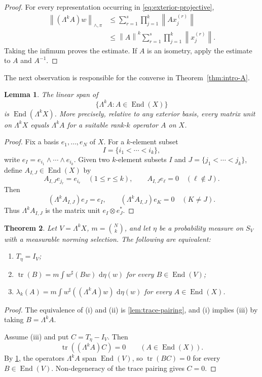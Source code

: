 \documentclass[11pt,a4paper]{amsart}
\numberwithin{equation}{section}
\theoremstyle{plain}
\newtheorem{theorem}{Theorem}[section]
\newtheorem{lemma}[theorem]{Lemma}
\theoremstyle{definition}
\theoremstyle{remark}
\DeclareMathOperator{\End}{End}
\DeclareMathOperator{\tr}{tr}
\newcommand{\dd}{\,\mathrm{d}}
\newcommand{\Id}{I}
\newcommand{\norm}[1]{\left\|#1\right\|}
\begin{document}
\begin{proof}
For every representation occurring in \eqref{eq:exterior-projective},
\begin{align*}
\norm{(\Lambda^kA)w}_{\wedge,\pi}
&\leqslant\sum_{r=1}^s\prod_{j=1}^k\norm{Ax_j^{(r)}}\\
&\leqslant\norm{A}^k\sum_{r=1}^s\prod_{j=1}^k\norm{x_j^{(r)}}.
\end{align*}
Taking the infimum proves the estimate. If $A$ is an isometry, apply the estimate to $A$ and $A^{-1}$.
\end{proof}

The next observation is responsible for the converse in Theorem~\ref{thm:intro-A}.

\begin{lemma}\label{lem:matrix-units}
The linear span of
\[
\{\Lambda^kA:A\in\End(X)\}
\]
is $\End(\Lambda^kX)$. More precisely, relative to any exterior basis, every matrix unit on $\Lambda^kX$ equals $\Lambda^kA$ for a suitable rank-$k$ operator $A$ on $X$.
\end{lemma}

\begin{proof}
Fix a basis $e_1,\ldots,e_N$ of $X$. For a $k$-element subset
\[
I=\{i_1<\cdots<i_k\},
\]
write $e_I=e_{i_1}\wedge\cdots\wedge e_{i_k}$. Given two $k$-element subsets $I$ and $J=\{j_1<\cdots<j_k\}$, define $A_{I,J}\in\End(X)$ by
\[
A_{I,J}e_{j_r}=e_{i_r}\quad(1\leqslant r\leqslant k),
\qquad
A_{I,J}e_\ell=0\quad(\ell\notin J).
\]
Then
\[
(\Lambda^kA_{I,J})e_J=e_I,
\qquad
(\Lambda^kA_{I,J})e_K=0\quad(K\neq J).
\]
Thus $\Lambda^kA_{I,J}$ is the matrix unit $e_I\otimes e_J^*$.
\end{proof}

\begin{theorem}\label{thm:exact-criterion}
Let $V=\Lambda^kX$, $m=\binom Nk$, and let $\eta$ be a probability measure on $S_V$ with a measurable norming selection. The following are equivalent:
\begin{enumerate}[label=\textup{(\roman*)}]
\item $T_\eta=\Id_V$;
\item $\tr(B)=m\int w^\sharp(Bw)\,\dd\eta(w)$ for every $B\in\End(V)$;
\item $\lambda_k(A)=m\int w^\sharp((\Lambda^kA)w)\,\dd\eta(w)$ for every $A\in\End(X)$.
\end{enumerate}
\end{theorem}

\begin{proof}
The equivalence of (i) and (ii) is \cref{lem:trace-pairing}, and (i) implies (iii) by taking $B=\Lambda^kA$.

Assume (iii) and put $C=T_\eta-\Id_V$. Then
\[
\tr((\Lambda^kA)C)=0
\qquad(A\in\End(X)).
\]
By \cref{lem:matrix-units}, the operators $\Lambda^kA$ span $\End(V)$, so $\tr(BC)=0$ for every $B\in\End(V)$. Non-degeneracy of the trace pairing gives $C=0$.
\end{proof}
\end{document}
